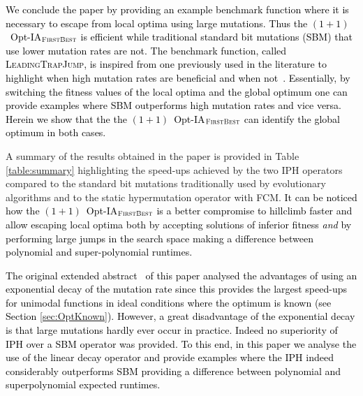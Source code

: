 \documentclass[lettersize,journal]{IEEEtran}
\newcommand{\new}[1]{\textcolor{black}{#1}}
\begin{document}
\new{We conclude the paper by providing an example benchmark function where it is necessary to escape from local optima using large mutations. Thus the $(1+1)$~Opt-IA$_{\textsc{FirstBest}}$ is efficient while traditional standard bit mutations (SBM) that use lower mutation rates are not. The benchmark function, called \textsc{LeadingTrapJump}, is inspired from one previously used in the literature to highlight when high mutation rates are beneficial and when not~\cite{OlivetoLehreNeumann09}. Essentially, by switching the fitness values of the local optima and the global optimum one can provide examples where SBM outperforms high mutation rates and vice versa. Herein we show that the the $(1+1)$~Opt-IA$_{\textsc{FirstBest}}$ can identify the global optimum in both cases.}



A summary of the results obtained in the paper is provided in Table \ref{table:summary} highlighting the speed-ups achieved by the two IPH operators compared to the standard bit mutations traditionally  used by evolutionary algorithms and to the static hypermutation operator with FCM.
\new{It can be noticed how the $(1+1)$~Opt-IA$_{\textsc{FirstBest}}$ is a better compromise to hillclimb faster and allow escaping local optima both by accepting solutions of inferior fitness {\it and} by performing large jumps in the search space making a difference between polynomial and super-polynomial runtimes.}

\new{The original extended abstract~\cite{CorusOlivetoYazdaniIPH2019} of this paper analysed the advantages of using an exponential decay of the mutation rate since this provides the largest speed-ups for unimodal functions in ideal conditions where the optimum is known (see Section \ref{sec:OptKnown}). However, a great disadvantage of the exponential decay is that large mutations hardly ever occur in practice. Indeed no superiority of IPH over a SBM operator was provided.  To this end, in this paper we analyse the use of the linear decay operator and  provide examples where the IPH indeed considerably outperforms SBM providing a difference between polynomial and superpolynomial expected runtimes.}



 
 
 
\end{document}
